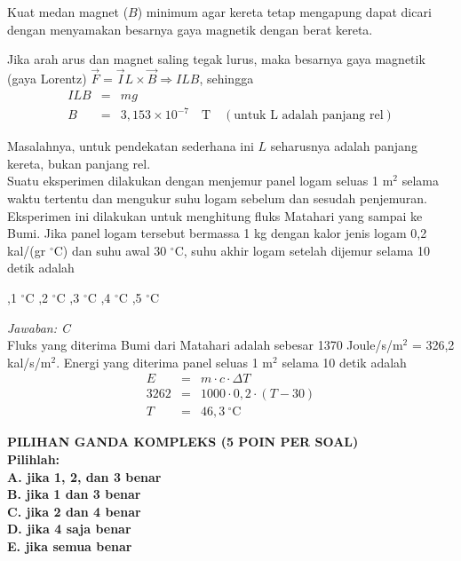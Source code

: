\documentclass[11pt,fleqn]{exam}
\begin{document}
\begin{questions}
Kuat medan magnet ($B$) minimum agar kereta tetap mengapung dapat dicari dengan menyamakan besarnya gaya magnetik dengan berat kereta.

Jika arah arus dan magnet saling tegak lurus, maka besarnya gaya magnetik (gaya Lorentz) $\overrightarrow{F} = \overrightarrow{I}L \times \overrightarrow{B} \Rightarrow ILB$, sehingga
\begin{eqnarray*}
ILB &=& mg\\
B &=&3,153 \times 10^{-7} \quad \text{T} \quad (\text{untuk L adalah panjang rel})
\end{eqnarray*}

Masalahnya, untuk pendekatan sederhana ini $L$ seharusnya adalah panjang kereta, bukan panjang rel.\\



\question Suatu eksperimen dilakukan dengan menjemur panel logam seluas 1 m$^2$ selama waktu tertentu dan mengukur suhu logam sebelum dan sesudah penjemuran. Eksperimen ini dilakukan untuk menghitung fluks Matahari yang sampai ke Bumi. Jika panel logam tersebut bermassa 1 kg dengan kalor jenis logam 0,2 kal/(gr $^{\circ}$C) dan suhu awal 30 $^{\circ}$C, suhu akhir logam setelah dijemur selama 10 detik adalah
\begin{choices}
,1 $^{\circ}$C
,2 $^{\circ}$C
,3 $^{\circ}$C
,4 $^{\circ}$C
,5 $^{\circ}$C
\end{choices}


\textit{Jawaban: C}\\

Fluks yang diterima Bumi dari Matahari adalah sebesar 1370 Joule/s/m$^2$ = 326,2 kal/s/m$^{2}$. Energi yang diterima panel seluas 1 m$^2$ selama 10 detik adalah
\begin{eqnarray*}
E &=& m \cdot c \cdot \Delta T\\
3262 &=& 1000 \cdot 0,2 \cdot (T - 30)\\
T &=& 46,3 ~^{\circ}\text{C}
\end{eqnarray*}

\vspace{0.5cm}
\textbf{PILIHAN GANDA KOMPLEKS (5 POIN PER SOAL)\\ Pilihlah:}\\
\textbf{A. jika 1, 2, dan 3 benar}\\
\textbf{B. jika 1 dan 3 benar}\\
\textbf{C. jika 2 dan 4 benar}\\
\textbf{D. jika 4 saja benar}\\
\textbf{E. jika semua benar}\\



\end{questions}
\end{document}
